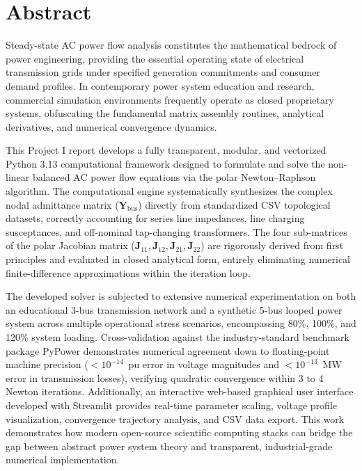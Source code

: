 \documentclass[12pt,a4paper,oneside]{report}
\begin{document}
\clearpage

\chapter*{Abstract}
Steady-state AC power flow analysis constitutes the mathematical bedrock of power engineering, providing the essential operating state of electrical transmission grids under specified generation commitments and consumer demand profiles. In contemporary power system education and research, commercial simulation environments frequently operate as closed proprietary systems, obfuscating the fundamental matrix assembly routines, analytical derivatives, and numerical convergence dynamics.

This Project I report develops a fully transparent, modular, and vectorized Python 3.13 computational framework designed to formulate and solve the non-linear balanced AC power flow equations via the polar Newton--Raphson algorithm. The computational engine systematically synthesizes the complex nodal admittance matrix ($\mathbf{Y}_{\text{bus}}$) directly from standardized CSV topological datasets, correctly accounting for series line impedances, line charging susceptances, and off-nominal tap-changing transformers. The four sub-matrices of the polar Jacobian matrix ($\mathbf{J}_{11}, \mathbf{J}_{12}, \mathbf{J}_{21}, \mathbf{J}_{22}$) are rigorously derived from first principles and evaluated in closed analytical form, entirely eliminating numerical finite-difference approximations within the iteration loop.

The developed solver is subjected to extensive numerical experimentation on both an educational 3-bus transmission network and a synthetic 5-bus looped power system across multiple operational stress scenarios, encompassing 80\%, 100\%, and 120\% system loading. Cross-validation against the industry-standard benchmark package PyPower demonstrates numerical agreement down to floating-point machine precision ($< 10^{-14}$~pu error in voltage magnitudes and $< 10^{-13}$~MW error in transmission losses), verifying quadratic convergence within 3 to 4 Newton iterations. Additionally, an interactive web-based graphical user interface developed with Streamlit provides real-time parameter scaling, voltage profile visualization, convergence trajectory analysis, and CSV data export. This work demonstrates how modern open-source scientific computing stacks can bridge the gap between abstract power system theory and transparent, industrial-grade numerical implementation.
\end{document}
